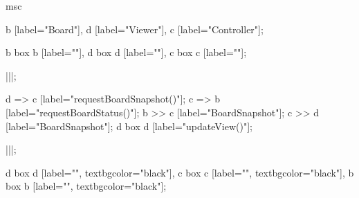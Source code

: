 \begin{msc}
msc {

b [label="Board"],
d [label="Viewer"],
c [label="Controller"];

b box b [label=""],
d box d [label=""],
c box c [label=""];

|||;

d => c [label="requestBoardSnapshot()"];
c => b [label="requestBoardStatus()"];
b >> c [label="BoardSnapshot"];
c >> d [label="BoardSnapshot"];
d box d [label="updateView()"];

|||;

d box d [label="", textbgcolor="black"],
c box c [label="", textbgcolor="black"],
b box b [label="", textbgcolor="black"];

}
\end{msc}
